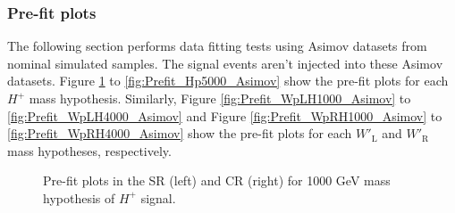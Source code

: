 \subsubsection{Pre-fit plots}
\label{subsubsec:PrefitPlotsForAsimov}
The following section performs data fitting tests using Asimov datasets from nominal simulated samples. The signal events aren't injected into these Asimov datasets. Figure \ref{fig:Prefit_Hp1000_Asimov} to \ref{fig:Prefit_Hp5000_Asimov} show the pre-fit plots for each $H^{+}$ mass hypothesis. Similarly,  Figure \ref{fig:Prefit_WpLH1000_Asimov} to \ref{fig:Prefit_WpLH4000_Asimov} and  Figure \ref{fig:Prefit_WpRH1000_Asimov} to \ref{fig:Prefit_WpRH4000_Asimov} show the pre-fit plots for each $W'_{\text{L}}$ and $W'_{\text{R}}$ mass hypotheses, respectively.

\begin{figure}[H]
  \centering
  \caption{Pre-fit plots in the SR (left) and CR (right) for 1000 GeV mass hypothesis of $H^{+}$ signal.}
  \label{fig:Prefit_Hp1000_Asimov}
\end{figure}
